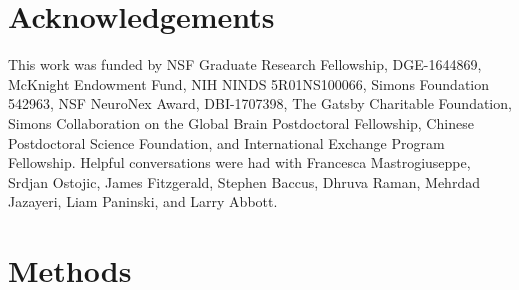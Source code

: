 \documentclass[11pt]{article}
\begin{document}
\newpage 




\newpage 

\appendix

\section{Acknowledgements}
This work was funded by NSF Graduate Research Fellowship,  DGE-1644869, McKnight Endowment Fund, NIH NINDS 5R01NS100066, Simons Foundation 542963, NSF NeuroNex Award, DBI-1707398, The Gatsby Charitable Foundation, Simons Collaboration on the Global Brain Postdoctoral Fellowship, Chinese Postdoctoral Science Foundation, and International Exchange Program Fellowship. 
Helpful conversations were had with Francesca Mastrogiuseppe, Srdjan Ostojic, James Fitzgerald, Stephen Baccus, Dhruva Raman, Mehrdad Jazayeri, Liam Paninski, and Larry Abbott.

\section{Methods}
\end{document}
